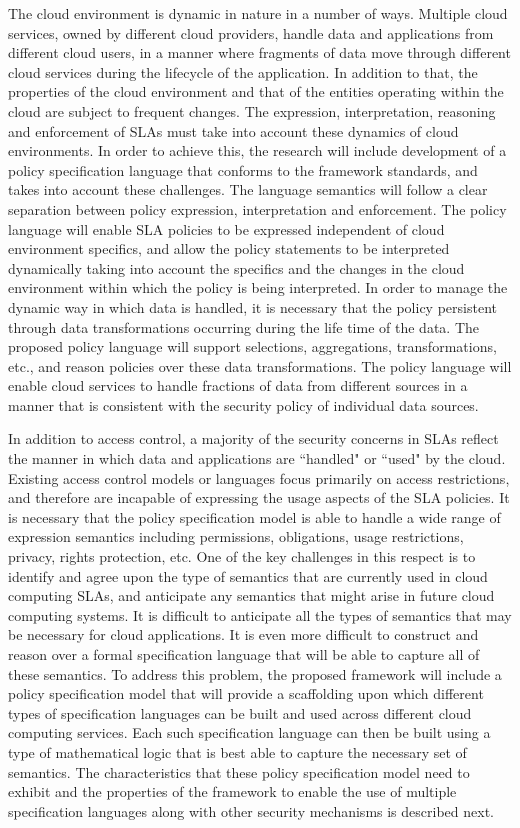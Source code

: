 \documentclass[times, 10pt,twocolumn]{article}
\begin{document}
The cloud environment is dynamic in nature in a number of ways. Multiple cloud services, owned by different cloud providers, handle data and applications from different cloud users, in a manner where fragments of data move through different cloud services during the lifecycle of the application. In addition to that, the properties of the cloud environment and that of the entities operating within the cloud are subject to frequent changes. The expression, interpretation, reasoning and enforcement of SLAs must take into account these dynamics of cloud environments.  In order to achieve this, the research will include development of a policy specification language that conforms to the framework standards, and takes into account these challenges. The language semantics will follow a clear separation between policy expression, interpretation and enforcement. The policy language will enable SLA policies to be expressed independent of cloud environment specifics, and allow the policy statements to be interpreted dynamically taking into account the specifics and the changes in the cloud environment within which the policy is being interpreted.  In order to manage the dynamic way in which data is handled, it is necessary that the policy persistent through data transformations occurring during the life time of the data. The proposed policy language will support selections, aggregations, transformations, etc., and reason policies over these data transformations. The policy language will enable cloud services to handle fractions of data from different sources in a manner that is consistent with the security policy of individual data sources. 

In addition to access control, a majority of the security concerns in SLAs reflect the manner in which data and applications are ``handled" or ``used" by the cloud.  Existing access control models or languages focus primarily on access restrictions, and therefore are incapable of expressing the usage aspects of the SLA policies. It is necessary that the policy specification model is able to handle a wide range of expression semantics including permissions, obligations, usage restrictions, privacy, rights protection, etc. One of the key challenges in this respect is to identify and agree upon the type of semantics that are currently used in cloud computing SLAs, and anticipate any semantics that might arise in future cloud computing systems. It is difficult to anticipate all the types of semantics that may be necessary for cloud applications. It is even more difficult to construct and reason over a formal specification language that will be able to capture all of these semantics. To address this problem, the proposed framework will include a policy specification model that will provide a scaffolding  upon which different types of specification languages can be built and used across different cloud computing services. Each such specification language can then be built using a type of mathematical logic that is best able to capture the necessary set of semantics. The characteristics that these policy specification model need to exhibit and the properties of the framework to enable the use of multiple specification languages along with other security mechanisms is described next. 
\end{document}
